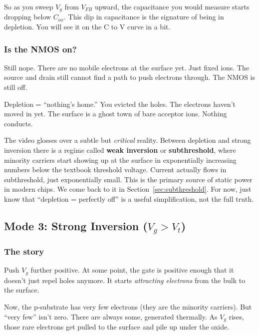 \documentclass[11pt]{article}
\begin{document}
So as you sweep $V_g$ from $V_{FB}$ upward, the capacitance you would measure starts dropping below $C_{ox}$. This dip in capacitance is the signature of being in depletion. You will see it on the C to V curve in a bit.

\subsubsection{Is the NMOS on?}

Still nope. There are no mobile electrons at the surface yet. Just fixed ions. The source and drain still cannot find a path to push electrons through. The NMOS is still off.

\begin{hook}
Depletion = ``nothing's home.'' You evicted the holes. The electrons haven't moved in yet. The surface is a ghost town of bare acceptor ions. Nothing conducts.
\end{hook}

\begin{pitfall}
The video glosses over a subtle but \emph{critical} reality. Between depletion and strong inversion there is a regime called \textbf{weak inversion} or \textbf{subthreshold}, where minority carriers start showing up at the surface in exponentially increasing numbers below the textbook threshold voltage. Current actually flows in subthreshold, just exponentially small. This is the primary source of static power in modern chips. We come back to it in Section~\ref{sec:subthreshold}. For now, just know that ``depletion = perfectly off'' is a useful simplification, not the full truth.
\end{pitfall}

\subsection{Mode 3: Strong Inversion ($V_g > V_t$)}

\subsubsection{The story}

Push $V_g$ further positive. At some point, the gate is positive enough that it doesn't just repel holes anymore. It starts \emph{attracting electrons} from the bulk to the surface.

Now, the p-substrate has very few electrons (they are the minority carriers). But ``very few'' isn't zero. There are always some, generated thermally. As $V_g$ rises, those rare electrons get pulled to the surface and pile up under the oxide.
\end{document}
